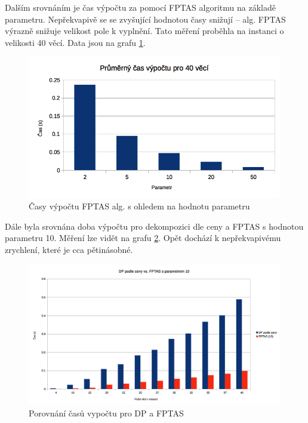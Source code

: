 \documentclass[a4paper]{article}
\begin{document}
	Dalším srovnáním je čas výpočtu za pomocí FPTAS algoritmu na základě parametru. Nepřekvapivě se se zvyšující hodnotou časy snižují -- alg. FPTAS výrazně snižuje velikost pole k vyplnění. Tato měření proběhla na instanci o velikosti 40 věcí. Data jsou na grafu \ref{fptas-times}.
	
	\begin{figure}[h]\centering
		\includegraphics[width=0.99\textwidth]{casyFPTAS.png}  
		\caption{Časy výpočtu FPTAS alg. s ohledem na hodnotu parametru}
		\label{fptas-times}
	\end{figure}
	
	Dále byla srovnána doba výpočtu pro dekompozici dle ceny a FPTAS s hodnotou parametru 10. Měření lze vidět na grafu \ref{fptas-vs-dynamic}. Opět dochází k nepřekvapivému zrychlení, které je cca pětinásobné.
	
	\begin{figure}[h]\centering
		\includegraphics[width=0.99\textwidth]{DPvsFPTAS.png} 
		\caption{Porovnání časů vypočtu pro DP a FPTAS}
		\label{fptas-vs-dynamic}
	\end{figure}
	
\end{document}
